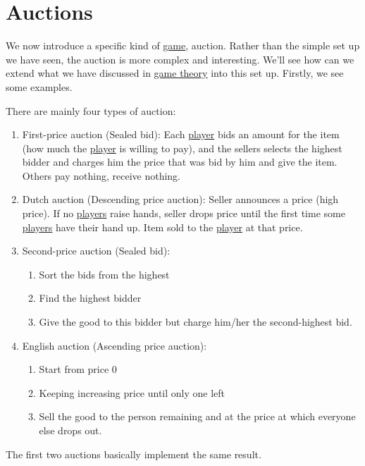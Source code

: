
\chapter{Auctions}\label{ch:auctions}
We now introduce a specific kind of \hyperref[def:mathematical-Bayesian-game]{game}, auction. Rather than the simple set up we have seen,
the auction is more complex and interesting. We'll see how can we extend what we have discussed in \hyperref[ch:game-theory]{game theory}
into this set up. Firstly, we see some examples.

\begin{eg}[Auctions]
	There are mainly four types of auction:
	\begin{enumerate}
		\item\label{eg:first-price-auction} First-price auction (Sealed bid): Each \hyperref[def:player]{player} bids an amount for the item (how much the \hyperref[def:player]{player} is willing to pay),
		and the sellers selects the highest bidder and charges him the price that was bid by him and give the item. Others pay nothing, receive nothing.
		\item\label{eg:Dutch-auction} Dutch auction (Descending price auction): Seller announces a price (high price). If no \hyperref[def:player]{players} raise hands, seller drops price until
		the first time some \hyperref[def:player]{players} have their hand up. Item sold to the \hyperref[def:player]{player} at that price.
		\item\label{eg:second-price-auction} Second-price auction (Sealed bid):
		\begin{enumerate}
			\item Sort the bids from the highest
			\item Find the highest bidder
			\item Give the good to this bidder but charge him/her the second-highest bid.
		\end{enumerate}
		\item\label{eg:English-auction} English auction (Ascending price auction):
		\begin{enumerate}
			\item Start from price \(0\)
			\item Keeping increasing price until only one left
			\item Sell the good to the person remaining and at the price at which everyone else drops out.
		\end{enumerate}
	\end{enumerate}
\end{eg}
\begin{remark}
	The first two auctions basically implement the same result.
\end{remark}

